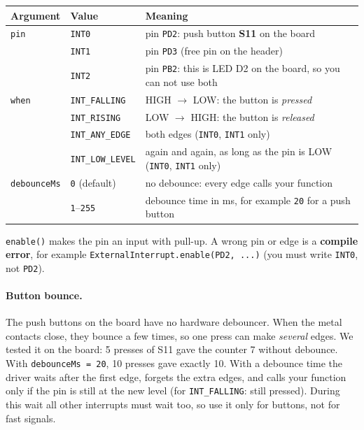 \documentclass[11pt,a4paper]{article}
\newcommand{\code}[1]{\texttt{#1}}
\begin{document}
\begin{center}
\small
\begin{tabularx}{\textwidth}{@{}l l >{\raggedright\arraybackslash}X@{}}
\toprule
\textbf{Argument} & \textbf{Value} & \textbf{Meaning} \\
\midrule
\code{pin} & \code{INT0} & pin \code{PD2}: push button \textbf{S11} on the board \\
           & \code{INT1} & pin \code{PD3} (free pin on the header) \\
           & \code{INT2} & pin \code{PB2}: this is LED D2 on the board, so you can not use both \\
\midrule
\code{when} & \code{INT\_FALLING}   & HIGH $\rightarrow$ LOW: the button is \emph{pressed} \\
            & \code{INT\_RISING}    & LOW $\rightarrow$ HIGH: the button is \emph{released} \\
            & \code{INT\_ANY\_EDGE} & both edges (\code{INT0}, \code{INT1} only) \\
            & \code{INT\_LOW\_LEVEL} & again and again, as long as the pin is LOW (\code{INT0}, \code{INT1} only) \\
\midrule
\code{debounceMs} & \code{0} (default) & no debounce: every edge calls your function \\
                  & \code{1}--\code{255} & debounce time in ms, for example \code{20} for a push button \\
\bottomrule
\end{tabularx}
\end{center}

\code{enable()} makes the pin an input with pull-up. A wrong pin or edge is a
\textbf{compile error}, for example \code{ExternalInterrupt.enable(PD2, ...)}
(you must write \code{INT0}, not \code{PD2}).

\paragraph{Button bounce.} The push buttons on the board have no hardware
debouncer. When the metal contacts close, they bounce a few times, so one press
can make \emph{several} edges. We tested it on the board: 5 presses of S11 gave
the counter 7 without debounce. With \code{debounceMs = 20}, 10 presses gave
exactly 10. With a debounce time the driver waits after the first edge, forgets
the extra edges, and calls your function only if the pin is still at the new
level (for \code{INT\_FALLING}: still pressed). During this wait all other
interrupts must wait too, so use it only for buttons, not for fast signals.
\end{document}
